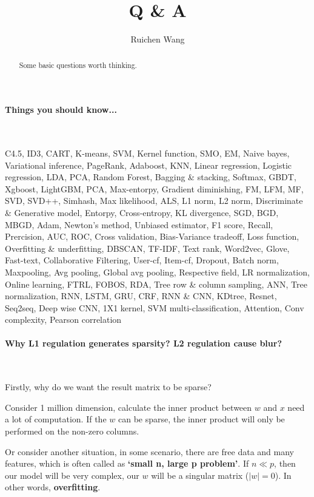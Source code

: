 \documentclass{article}
\author{Ruichen Wang}
\title{Q \& A}
\begin{document}
\maketitle
\begin{abstract}
Some basic questions worth thinking.
\end{abstract}
\noindent
\paragraph{Things you should know...}~{}

C4.5, ID3, CART, K-means, SVM, Kernel function, SMO, EM, Naive bayes, Variational inference, PageRank, Adaboost, KNN,  Linear regression, Logistic regression, LDA, PCA, Random Forest, Bagging \& stacking, Softmax, GBDT, Xgboost, LightGBM, PCA, Max-entorpy, Gradient diminishing, FM, LFM, MF, SVD, SVD++, Simhash, Max likelihood, ALS, L1 norm, L2 norm, Discriminate \& Generative model, Entorpy, Cross-entropy, KL divergence, SGD, BGD, MBGD, Adam, Newton's method, Unbiased estimator, F1 score, Recall, Prercision, AUC, ROC, Cross validation, Bias-Variance tradeoff, Loss function, Overfitting \& underfitting, DBSCAN, TF-IDF, Text rank, Word2vec, Glove, Fast-text, Collaborative Filtering, User-cf, Item-cf, Dropout, Batch norm, Maxpooling, Avg pooling, Global avg pooling, Respective field, LR normalization, Online learning, FTRL, FOBOS, RDA, Tree row \& column sampling,  ANN, Tree normalization, RNN, LSTM, GRU, CRF, RNN \& CNN, KDtree, Resnet, Seq2seq, Deep wise CNN, 1X1 kernel, SVM multi-classification, Attention, Conv complexity, Pearson correlation


\paragraph{Why L1 regulation generates sparsity? L2 regulation cause blur?}~{}

Firstly, why do we want the result matrix to be sparse?

Consider 1 million dimension, calculate the inner product between $w$ and $x$ need a lot of computation. If the $w$ can be sparse, the inner product will only be performed on the non-zero columns.

Or consider another situation, in some scenario, there are free data and many features, which is often called as \textbf{`small n, large p problem'}. If $n \ll p $, then our model will be very complex, our $w$ will be a singular matrix ($|w|=0$). In other words, \textbf{overfitting}.
\end{document}
